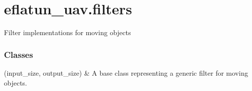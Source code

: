 \documentclass[letterpaper,10pt,english]{sphinxmanual}
\begin{document}
\sphinxstepscope


\section{eflatun\_uav.filters}
\label{\detokenize{generated/eflatun_uav.filters:module-eflatun_uav.filters}}\label{\detokenize{generated/eflatun_uav.filters:eflatun-uav-filters}}\label{\detokenize{generated/eflatun_uav.filters::doc}}
\sphinxAtStartPar
Filter implementations for moving objects
\subsubsection*{Classes}


\begin{savenotes}\sphinxattablestart
\sphinxthistablewithglobalstyle
\sphinxthistablewithnovlinesstyle
\centering
\begin{tabulary}{\linewidth}[t]{}
\sphinxtoprule
\sphinxtableatstartofbodyhook
\sphinxAtStartPar
{\hyperref[\detokenize{generated/eflatun_uav.filters:eflatun_uav.filters.BaseFilter}]{}}(input\_size, output\_size)
&
\sphinxAtStartPar
A base class representing a generic filter for moving objects.
\\
\sphinxbottomrule
\end{tabulary}
\sphinxtableafterendhook\par
\sphinxattableend\end{savenotes}
\end{document}
